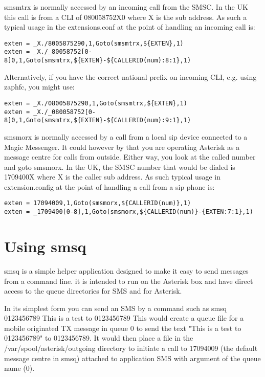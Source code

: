    smsmtrx is normally accessed by an incoming call from the SMSC. In the
   UK this call is from a CLI of 080058752X0 where X is the sub address.
   As such a typical usage in the extensions.conf at the point of
   handling an incoming call is:

\begin{verbatim}
exten = _X./8005875290,1,Goto(smsmtrx,${EXTEN},1)
exten = _X./_80058752[0-8]0,1,Goto(smsmtrx,${EXTEN}-${CALLERID(num):8:1},1)
\end{verbatim}

   Alternatively, if you have the correct national prefix on incoming
   CLI, e.g. using zaphfc, you might use:

\begin{verbatim}
exten = _X./08005875290,1,Goto(smsmtrx,${EXTEN},1)
exten = _X./_080058752[0-8]0,1,Goto(smsmtrx,${EXTEN}-${CALLERID(num):9:1},1)
\end{verbatim}

   smsmorx is normally accessed by a call from a local sip device
   connected to a Magic Messenger. It could however by that you are
   operating Asterisk as a message centre for calls from outside. Either
   way, you look at the called number and goto smsmorx. In the UK, the
   SMSC number that would be dialed is 1709400X where X is the caller sub
   address. As such typical usage in extension.config at the point of
   handling a call from a sip phone is:

\begin{verbatim}
exten = 17094009,1,Goto(smsmorx,${CALLERID(num)},1)
exten = _1709400[0-8],1,Goto(smsmorx,${CALLERID(num)}-{EXTEN:7:1},1)
\end{verbatim}

\section{Using smsq}

   smsq is a simple helper application designed to make it easy to send
   messages from a command line. it is intended to run on the Asterisk
   box and have direct access to the queue directories for SMS and for
   Asterisk.

   In its simplest form you can send an SMS by a command such as
   smsq 0123456789 This is a test to 0123456789
   This would create a queue file for a mobile originated TX message in
   queue 0 to send the text "This is a test to 0123456789" to 0123456789.
   It would then place a file in the /var/spool/asterisk/outgoing
   directory to initiate a call to 17094009 (the default message centre
   in smsq) attached to application SMS with argument of the queue name
   (0).

